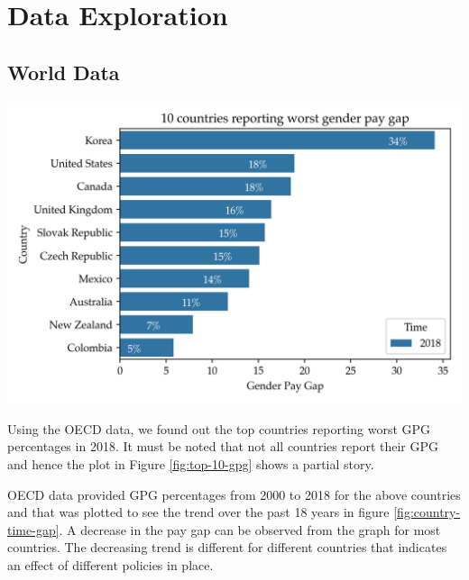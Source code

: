 \section{Data Exploration}

\subsection{World Data}
    \begin{centering}
        \includegraphics[width=0.99\linewidth]{images/Top10Countries.png}
        \label{fig:top-10-gpg}
    \end{centering}
Using the OECD data, we found out the top countries reporting worst GPG percentages in 2018. It must be noted that not all countries report their GPG and hence the plot in Figure \ref{fig:top-10-gpg} shows a partial story.


    
OECD data provided GPG percentages from 2000 to 2018 for the above countries and that was plotted to see the trend over the past 18 years in figure \ref{fig:country-time-gap}. A decrease in the pay gap can be observed from the graph for most countries. The decreasing trend is different for different countries that indicates an effect of different policies in place.

